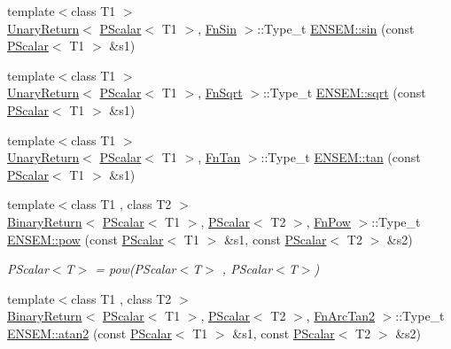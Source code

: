 \begin{DoxyCompactItemize}
\item 
{\footnotesize template$<$class T1 $>$ }\\\mbox{\hyperlink{structENSEM_1_1UnaryReturn}{Unary\+Return}}$<$ \mbox{\hyperlink{classENSEM_1_1PScalar}{P\+Scalar}}$<$ T1 $>$, \mbox{\hyperlink{structENSEM_1_1FnSin}{Fn\+Sin}} $>$\+::Type\+\_\+t \mbox{\hyperlink{group__primscalar_gaa9443eab6edf0a2d0c707614f108a8e3}{E\+N\+S\+E\+M\+::sin}} (const \mbox{\hyperlink{classENSEM_1_1PScalar}{P\+Scalar}}$<$ T1 $>$ \&s1)
\item 
{\footnotesize template$<$class T1 $>$ }\\\mbox{\hyperlink{structENSEM_1_1UnaryReturn}{Unary\+Return}}$<$ \mbox{\hyperlink{classENSEM_1_1PScalar}{P\+Scalar}}$<$ T1 $>$, \mbox{\hyperlink{structENSEM_1_1FnSqrt}{Fn\+Sqrt}} $>$\+::Type\+\_\+t \mbox{\hyperlink{group__primscalar_ga07f86503a0138d56e1948dd554ec3e10}{E\+N\+S\+E\+M\+::sqrt}} (const \mbox{\hyperlink{classENSEM_1_1PScalar}{P\+Scalar}}$<$ T1 $>$ \&s1)
\item 
{\footnotesize template$<$class T1 $>$ }\\\mbox{\hyperlink{structENSEM_1_1UnaryReturn}{Unary\+Return}}$<$ \mbox{\hyperlink{classENSEM_1_1PScalar}{P\+Scalar}}$<$ T1 $>$, \mbox{\hyperlink{structENSEM_1_1FnTan}{Fn\+Tan}} $>$\+::Type\+\_\+t \mbox{\hyperlink{group__primscalar_gac184e021b0af3d450c4db8f1a8fd75dc}{E\+N\+S\+E\+M\+::tan}} (const \mbox{\hyperlink{classENSEM_1_1PScalar}{P\+Scalar}}$<$ T1 $>$ \&s1)
\item 
{\footnotesize template$<$class T1 , class T2 $>$ }\\\mbox{\hyperlink{structENSEM_1_1BinaryReturn}{Binary\+Return}}$<$ \mbox{\hyperlink{classENSEM_1_1PScalar}{P\+Scalar}}$<$ T1 $>$, \mbox{\hyperlink{classENSEM_1_1PScalar}{P\+Scalar}}$<$ T2 $>$, \mbox{\hyperlink{structENSEM_1_1FnPow}{Fn\+Pow}} $>$\+::Type\+\_\+t \mbox{\hyperlink{group__primscalar_ga28323c8753f21f37983319d38eea45ee}{E\+N\+S\+E\+M\+::pow}} (const \mbox{\hyperlink{classENSEM_1_1PScalar}{P\+Scalar}}$<$ T1 $>$ \&s1, const \mbox{\hyperlink{classENSEM_1_1PScalar}{P\+Scalar}}$<$ T2 $>$ \&s2)
\begin{DoxyCompactList}\small\item\em P\+Scalar$<$\+T$>$ = pow(\+P\+Scalar$<$\+T$>$ , P\+Scalar$<$\+T$>$) \end{DoxyCompactList}\item 
{\footnotesize template$<$class T1 , class T2 $>$ }\\\mbox{\hyperlink{structENSEM_1_1BinaryReturn}{Binary\+Return}}$<$ \mbox{\hyperlink{classENSEM_1_1PScalar}{P\+Scalar}}$<$ T1 $>$, \mbox{\hyperlink{classENSEM_1_1PScalar}{P\+Scalar}}$<$ T2 $>$, \mbox{\hyperlink{structENSEM_1_1FnArcTan2}{Fn\+Arc\+Tan2}} $>$\+::Type\+\_\+t \mbox{\hyperlink{group__primscalar_gac0968ffacdebb29c939e8bfbfc391fd0}{E\+N\+S\+E\+M\+::atan2}} (const \mbox{\hyperlink{classENSEM_1_1PScalar}{P\+Scalar}}$<$ T1 $>$ \&s1, const \mbox{\hyperlink{classENSEM_1_1PScalar}{P\+Scalar}}$<$ T2 $>$ \&s2)

\end{DoxyCompactItemize}

